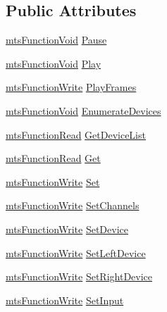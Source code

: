 \subsection*{Public Attributes}
\begin{DoxyCompactItemize}
\item 
\hyperlink{classmts_function_void}{mts\-Function\-Void} \hyperlink{class_i_req_filter_source_video_capture_a073a0413b996e5d4d245461e076e3795}{Pause}
\item 
\hyperlink{classmts_function_void}{mts\-Function\-Void} \hyperlink{class_i_req_filter_source_video_capture_a2a5cbec2e700b42d9881a46ffaf22386}{Play}
\item 
\hyperlink{classmts_function_write}{mts\-Function\-Write} \hyperlink{class_i_req_filter_source_video_capture_a79b1131e86440f72689500c70fa6da2b}{Play\-Frames}
\item 
\hyperlink{classmts_function_void}{mts\-Function\-Void} \hyperlink{class_i_req_filter_source_video_capture_abc59889de1d32b2fe8ba4398588314d2}{Enumerate\-Devices}
\item 
\hyperlink{classmts_function_read}{mts\-Function\-Read} \hyperlink{class_i_req_filter_source_video_capture_a317e649c1acbd6bdeec62893e7ae3c40}{Get\-Device\-List}
\item 
\hyperlink{classmts_function_read}{mts\-Function\-Read} \hyperlink{class_i_req_filter_source_video_capture_a6692ac9a41d34e0ec4cb17dbd8302ac3}{Get}
\item 
\hyperlink{classmts_function_write}{mts\-Function\-Write} \hyperlink{class_i_req_filter_source_video_capture_a39d844ff80462e2b32968766010a22e4}{Set}
\item 
\hyperlink{classmts_function_write}{mts\-Function\-Write} \hyperlink{class_i_req_filter_source_video_capture_a108e41051db33f291542ec5275406561}{Set\-Channels}
\item 
\hyperlink{classmts_function_write}{mts\-Function\-Write} \hyperlink{class_i_req_filter_source_video_capture_a29ecf8df8a2b5905824e12b826fdd45c}{Set\-Device}
\item 
\hyperlink{classmts_function_write}{mts\-Function\-Write} \hyperlink{class_i_req_filter_source_video_capture_abb04c8aec2b24d2e8e9cb8325e9dc156}{Set\-Left\-Device}
\item 
\hyperlink{classmts_function_write}{mts\-Function\-Write} \hyperlink{class_i_req_filter_source_video_capture_a0e43451e18521c96cc53ac0034717e7e}{Set\-Right\-Device}
\item 
\hyperlink{classmts_function_write}{mts\-Function\-Write} \hyperlink{class_i_req_filter_source_video_capture_a89b90330287cf606ddd78da6e3ff99ac}{Set\-Input}

\end{DoxyCompactItemize}
